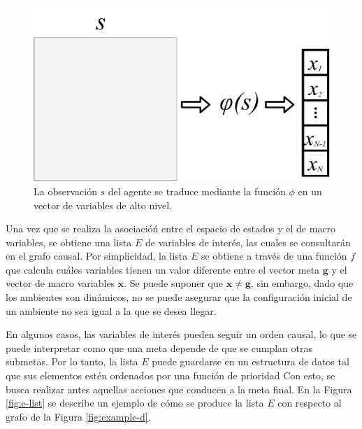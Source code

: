 \begin{figure}[h]
    \centering
    \includegraphics[scale=0.25]{Chapter4/Figs/stox.pdf}
    \caption{La observación $s$ del agente se traduce mediante la función $\phi$ en un vector de variables de alto nivel.}
    \label{fig:obs-to-macro}
\end{figure}

Una vez que se
realiza la asociacióń entre el espacio de
estados y el de macro variables, se obtiene una lista  $E$ de variables de interés, las cuales se consultarán en el grafo causal.
Por simplicidad, la lista $E$ se obtiene a través de una función $f$ que calcula cuáles variables tienen un valor diferente entre el vector meta $\mathbf{g}$
y el vector de macro variables $\mathbf{x}$. Se puede suponer que $\mathbf{x} \neq \mathbf{g}$, sin embargo, dado que los ambientes son dinámicos, no se puede asegurar que la configuración inicial de un ambiente no sea igual a la que se desea llegar. 

En algunos casos, las variables de interés pueden seguir un orden causal, lo que se puede interpretar como que una meta depende de que se cumplan otras submetas.
Por lo tanto, la lista $E$ puede guardarse en un estructura de datos tal que sus elementos estén ordenados por una función de prioridad
Con esto, se busca realizar antes aquellas acciones que conducen a la meta final.
En la Figura \ref{fig:e-list} se describe un ejemplo de cómo se produce la lista $E$ con respecto al grafo de la Figura \ref{fig:example-d}. 


